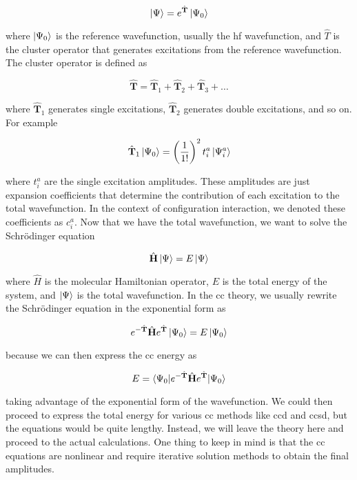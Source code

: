 \begin{equation}
\ket{\Psi}=e^{\hat{\mathbf{T}}}\ket{\Psi_0}
\end{equation}

where \(\ket{\Psi_0}\) is the reference wavefunction, usually the \acrshort{hf} wavefunction, and \(\hat{T}\) is the cluster operator that generates excitations from the reference wavefunction. The cluster operator is defined as

\begin{equation}
\hat{\mathbf{T}}=\hat{\mathbf{T}}_1+\hat{\mathbf{T}}_2+\hat{\mathbf{T}}_3+\dots
\end{equation}

where \(\hat{\mathbf{T}}_1\) generates single excitations, \(\hat{\mathbf{T}}_2\) generates double excitations, and so on. For example

\begin{equation}
\hat{\mathbf{T}}_1\ket{\Psi_0}=\left(\frac{1}{1!}\right)^2t_i^a\ket{\Psi_i^a}
\end{equation}

where \(t_i^a\) are the single excitation amplitudes. These amplitudes are just expansion coefficients that determine the contribution of each excitation to the total wavefunction. In the context of configuration interaction, we denoted these coefficients as \(c_i^a\). Now that we have the total wavefunction, we want to solve the Schrödinger equation

\begin{equation}
\hat{\mathbf{H}}\ket{\Psi}=E\ket{\Psi}
\end{equation}

where \(\hat{H}\) is the molecular Hamiltonian operator, \(E\) is the total energy of the system, and \(\ket{\Psi}\) is the total wavefunction. In the \acrshort{cc} theory, we usually rewrite the Schrödinger equation in the exponential form as

\begin{equation}
e^{-\hat{\mathbf{T}}}\hat{\mathbf{H}}e^{\hat{\mathbf{T}}}\ket{\Psi_0}=E\ket{\Psi_0}
\end{equation}

because we can then express the \acrshort{cc} energy as

\begin{equation}
E=\braket{\Psi_0|e^{-\hat{\mathbf{T}}}\hat{\mathbf{H}}e^{\hat{\mathbf{T}}}|\Psi_0}
\end{equation}

taking advantage of the exponential form of the wavefunction. We could then proceed to express the total energy for various \acrshort{cc} methods like \acrshort{ccd} and \acrshort{ccsd}, but the equations would be quite lengthy. Instead, we will leave the theory here and proceed to the actual calculations. One thing to keep in mind is that the \acrshort{cc} equations are nonlinear and require iterative solution methods to obtain the final amplitudes.

